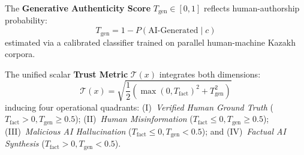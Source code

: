 The \textbf{Generative Authenticity Score} $T_{\text{gen}} \in [0, 1]$ reflects human-authorship probability:
\begin{equation}
\label{eq:trust_gen}
T_{\text{gen}} = 1 - P(\text{AI-Generated} \mid c)
\end{equation}
estimated via a calibrated classifier trained on parallel human-machine Kazakh corpora.

The unified scalar \textbf{Trust Metric} $\mathcal{T}(x)$ integrates both dimensions:
\begin{equation}
\label{eq:trust_score}
\mathcal{T}(x) = \sqrt{\frac{1}{2} \left(\max(0, T_{\text{fact}})^2 + T_{\text{gen}}^2\right)}
\end{equation}
inducing four operational quadrants: (I)~\textit{Verified Human Ground Truth} ($T_{\text{fact}} > 0, T_{\text{gen}} \ge 0.5$); (II)~\textit{Human Misinformation} ($T_{\text{fact}} \le 0, T_{\text{gen}} \ge 0.5$); (III)~\textit{Malicious AI Hallucination} ($T_{\text{fact}} \le 0, T_{\text{gen}} < 0.5$); and (IV)~\textit{Factual AI Synthesis} ($T_{\text{fact}} > 0, T_{\text{gen}} < 0.5$).
